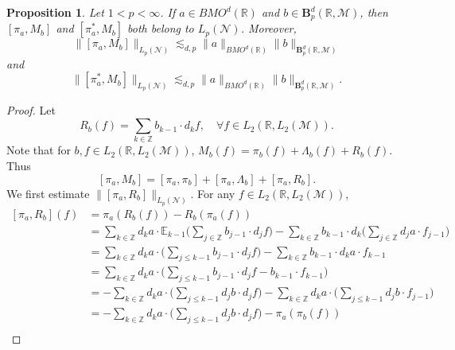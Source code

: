 \documentclass[oneside,english,a4wide]{amsart}
\numberwithin{equation}{section}
\numberwithin{figure}{section}
\theoremstyle{plain}
\theoremstyle{plain}
\newtheorem{proposition}[thm]{Proposition}
\theoremstyle{definition}
\theoremstyle{plain}
\theoremstyle{remark}
\theoremstyle{definition}
\theoremstyle{remark}
\theoremstyle{definition}
\newcommand{\8}{\infty}
\begin{document}
\begin{proposition}\label{T0est}
	Let $1<p<\infty$. If $a\in BMO^d(\mathbb{R})$ and $b\in \pmb{B}_p^{d}(\mathbb{R},\mathcal{M})$, then $[\pi_a,M_b]$ and $[\pi^*_a,M_b]$ both belong to $L_p(\mathcal{N})$. Moreover,
	\begin{equation*}
		\|[\pi_a,M_b]\|_{L_p(\mathcal{N})}\lesssim_{d,p} \|a\|_{BMO^d(\mathbb{R})} \|b\|_{\pmb{B}_p^{d}(\mathbb{R},\mathcal{M})}
	\end{equation*}
and
\begin{equation*}
	\|[\pi_a^*,M_b]\|_{L_p(\mathcal{N})}\lesssim_{d,p} \|a\|_{BMO^d(\mathbb{R})} \|b\|_{\pmb{B}_p^{d}(\mathbb{R},\mathcal{M})}.
\end{equation*}
\end{proposition} 
\begin{proof}
	Let
	\begin{equation}\label{R_b}
		R_b(f)=\sum_{k\in\mathbb{Z}}b_{k-1}\cdot d_kf, \quad \forall f\in L_2(\mathbb{R},L_2(\mathcal{M})).
	\end{equation}
	Note that for $b, f\in L_2(\mathbb{R},L_2(\mathcal{M}))$,  $M_b(f)=\pi_b(f)+\varLambda_b(f)+R_b(f)$. Thus
	$$ 	[\pi_{{a}},M_b]=[\pi_{{a}},\pi_b]+[\pi_{{a}},\varLambda_b]+[\pi_{{a}},R_b].$$
	We first estimate $\|[\pi_{a}, R_b]\|_{L_p(\mathcal{N})}$. For any $f\in L_2(\mathbb{R},L_2(\mathcal{M}))$,
	\begin{equation*}
		\begin{aligned}
			[\pi_{a}, R_b](f){}&=\pi_{a} (R_b(f))-R_b (\pi_{a}(f))\\
			&=\sum_{k\in\mathbb{Z}} d_ka\cdot\mathbb{E}_{k-1} \biggl(\sum_{j\in\mathbb{Z}} b_{j-1}\cdot d_jf \biggr)- \sum_{k\in\mathbb{Z}} b_{k-1} \cdot d_k \biggl(\sum_{j\in\mathbb{Z}} d_ja\cdot f_{j-1}\biggr)\\
			&=\sum_{k\in\mathbb{Z}} d_ka\cdot \biggl(\sum_{j\le k-1}b_{j-1}\cdot d_jf\biggr)-\sum_{k\in\mathbb{Z}} b_{k-1}\cdot d_ka\cdot f_{k-1}\\
			&=\sum_{k\in\mathbb{Z}} d_ka\cdot \biggl(\sum_{j\le k-1}b_{j-1}\cdot d_jf- b_{k-1}\cdot f_{k-1}\biggr)\\
			&=-\sum_{k\in\mathbb{Z}} d_ka\cdot \biggl( \sum_{j\le k-1}d_jb\cdot d_jf\biggr)-\sum_{k\in\mathbb{Z}} d_ka\cdot \biggl(\sum_{j\le k-1}d_jb\cdot f_{j-1}\biggr)\\
			&=-\sum_{k\in\mathbb{Z}} d_ka\cdot \biggl( \sum_{j\le k-1}d_jb\cdot d_jf\biggr)-\pi_{a}(\pi_b(f))\\

\end{aligned}
\end{equation*}
\end{proof}
\end{document}
